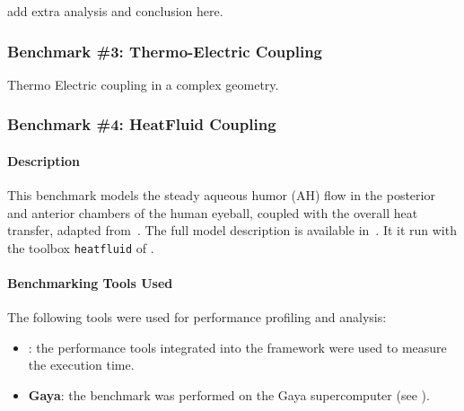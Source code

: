 add extra analysis  and conclusion here.

\subsubsection{Benchmark \#3: Thermo-Electric Coupling}

Thermo Electric coupling in a complex geometry.








\subsubsection{Benchmark \#4: HeatFluid Coupling}
\label{sec:WP1:Feelpp:benchmark4}

\newcommand{\vct}[1]{\vec{#1}}
\newcommand{\mat}[1]{\underline{\underline{#1}}}





\paragraph{Description}
This benchmark models the steady aqueous humor (AH) flow in the posterior and anterior chambers of the human eyeball, coupled with the overall heat transfer, adapted from~\cite{ooi_simulation_2008,kilgour_operator_2021}.
The full model description is available in~\cite{saigre_coupled_2024_abstract}.
It it run with the toolbox \texttt{heatfluid} of \Feelpp.


\paragraph{Benchmarking Tools Used}

The following tools were used for performance profiling and analysis:
\begin{itemize}
    \item \textbf{\Feelpp}: the performance tools integrated into the \Feelpp framework were used to measure the execution time.
    \item \textbf{Gaya}: the benchmark was performed on the Gaya supercomputer (see ).
\end{itemize}


